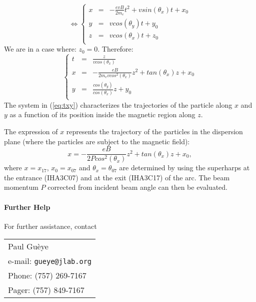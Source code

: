 \begin{equation}
\Leftrightarrow
\left \{
\begin{array}{lll}\label{eq:txy}
x & = &  -\frac{evB}{2m_e}t^2 + vsin(\theta _x)t + x_0	\\
y & = & vcos(\theta _y)t + y_0				\\
z & = & vcos(\theta _x)t + z_0				\\
\end{array}
\right .
\end{equation}
We are in a case where: $z_0 = 0$. Therefore:
\begin{equation}
\left \{
\begin{array}{lll}
t & = & \frac{z}{vcos(\theta_x)}					\\
x & = & -\frac{eB}{2m_evcos^2(\theta _x)}z^2 + tan(\theta _x)z + x_0	\\
y & = & \frac{cos(\theta _y)}{cos(\theta _x)}z + y_0			\\
\end{array}
\right .
\end{equation}
The system in (\ref{eq:txy}) characterizes the trajectories of the particle along
$x$ and $y$ as a function of its position inside the magnetic region along $z$.

The expression of $x$ represents the trajectory of the particles in the dispersion plane
(where the particles are subject to the magnetic field):
\begin{equation}
x = -\frac{eB}{2Pcos^2(\theta _x)}z^2 + tan(\theta _x)z + x_0,
\end{equation}
where $x = x_{17}$, $x_0 = x_{07}$ and $\theta _x = \theta _{07}$ are determined by using the superharps
at the entrance (IHA3C07) and at the exit (IHA3C17) of the arc. The beam momentum $P$ corrected from
incident beam angle can then be evaluated.

\paragraph{Further Help}

For further assistance, contact
\par
\noindent
\begin{table}[!ht]
\begin{tabular}{l}
Paul Gu\`eye \\
e-mail: {\tt gueye@jlab.org} \\
Phone: (757) 269-7167 \\
Pager: (757) 849-7167 \\
\end{tabular}
\end{table}



